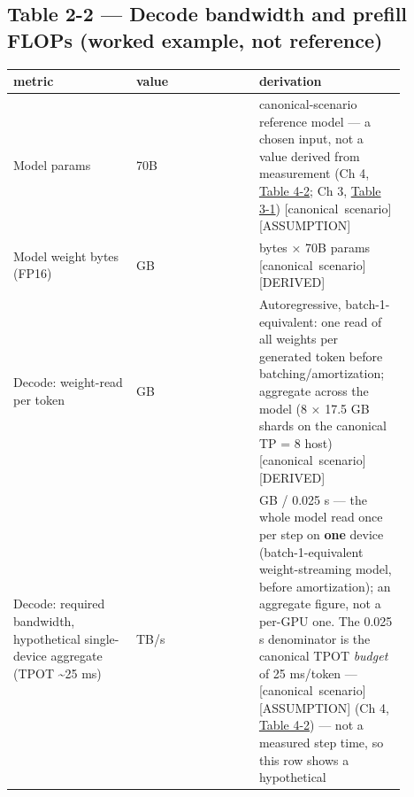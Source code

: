 
\subsection{Table 2-2 --- Decode bandwidth and prefill FLOPs (worked
example, not
reference)}\label{table-2-2-decode-bandwidth-and-prefill-flops-worked-example-not-reference}

\nopagebreak[4]
\begin{longtable}[]{@{}
  >{\raggedright\arraybackslash}p{0.2927\linewidth}
  >{\raggedright\arraybackslash}p{0.2927\linewidth}
  >{\raggedright\arraybackslash}p{0.2927\linewidth}@{}}
\toprule\noalign{}
\begin{minipage}[b]{\linewidth}\raggedright
metric
\end{minipage} & \begin{minipage}[b]{\linewidth}\raggedright
value
\end{minipage} & \begin{minipage}[b]{\linewidth}\raggedright
derivation
\end{minipage} \\
\midrule\noalign{}
\endhead
\bottomrule\noalign{}
\endlastfoot
Model params & 70B & canonical-scenario reference model --- a chosen
input, not a value derived from measurement (Ch 4, \hyperref[tab:4.2]{Table 4-2}; Ch 3,
\hyperref[tab:3.1]{Table 3-1}) \mbox{{[}canonical scenario{]}}\hspace{0pt}\mbox{{[}ASSUMPTION{]}} \\
\noalign{\label{tab:2.2}}
Model weight bytes (FP16) & 140 GB & 2 bytes × 70B params \mbox{{[}canonical
scenario{]}}\hspace{0pt}\mbox{{[}DERIVED{]}} \\
Decode: weight-read per token & 140 GB & Autoregressive,
batch-1-equivalent: one read of all weights per generated token before
batching/amortization; aggregate across the model (8 × 17.5 GB shards on
the canonical TP = 8 host) \mbox{{[}canonical scenario{]}}\hspace{0pt}\mbox{{[}DERIVED{]}} \\
Decode: required bandwidth, hypothetical single-device aggregate (TPOT
\textasciitilde25 ms) & 5.6 TB/s & 140 GB / 0.025 s --- the whole model
read once per step on \textbf{one} device (batch-1-equivalent
weight-streaming model, before amortization); an aggregate figure, not a
per-GPU one. The 0.025 s denominator is the canonical TPOT \emph{budget}
of 25 ms/token --- \mbox{{[}canonical scenario{]}}\hspace{0pt}\mbox{{[}ASSUMPTION{]}} (Ch 4, \hyperref[tab:4.2]{Table 4-2}) --- not a measured step time, so this row shows a hypothetical

\end{longtable}
